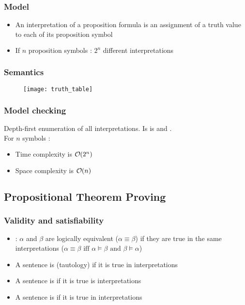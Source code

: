 \subsubsection{Model}

\begin{itemize}
\item An interpretation of a proposition formula is an assignment of a truth value to each of its proposition symbol
\item If $n$ proposition symbols : $2^n$ different interpretations 
\end{itemize}

\subsubsection{Semantics}

\begin{figure}[H]
    \centering
    \texttt{[image: truth\_table]}
\end{figure}

\subsubsection{Model checking}

Depth-first enumeration of all interpretations. Is is  and .\\
For $n$ symbols :
\begin{itemize}
\item Time complexity is $\bigO (2^n)$
\item Space complexity is $\bigO (n)$
\end{itemize}

\subsection{Propositional Theorem Proving}

\subsubsection{Validity and satisfiability}

\begin{itemize}
\item {} : $\alpha$ and $\beta$ are logically equivalent ($\alpha \equiv \beta$) if they are true in the same interpretations ($\alpha \equiv \beta \text{ iff } \alpha \models \beta \text{ and } \beta \models \alpha$)
\item A sentence is  (tautology) if it is true in  interpretations
\item A sentence is  if it is true is  interpretations
\item A sentence is  if it is true in  interpretations
\end{itemize}

